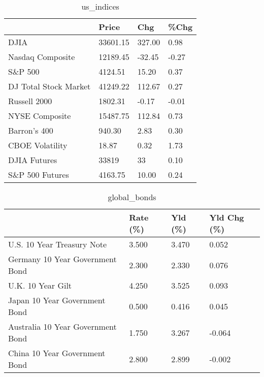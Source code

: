 \documentclass{article}%
\begin{document}
%


\begin{table}[htbp]%
\caption{us\_indices}%
\centering%
\begin{adjustbox}{width=1\textwidth}%
\begin{tabular}{llll}
\toprule
                      &    Price &    Chg &  \%Chg \\
\midrule
                 DJIA & 33601.15 & 327.00 &  0.98 \\
     Nasdaq Composite & 12189.45 & -32.45 & -0.27 \\
              S\&P 500 &  4124.51 &  15.20 &  0.37 \\
DJ Total Stock Market & 41249.22 & 112.67 &  0.27 \\
         Russell 2000 &  1802.31 &  -0.17 & -0.01 \\
       NYSE Composite & 15487.75 & 112.84 &  0.73 \\
         Barron's 400 &   940.30 &   2.83 &  0.30 \\
      CBOE Volatility &    18.87 &   0.32 &  1.73 \\
         DJIA Futures &    33819 &     33 &  0.10 \\
      S\&P 500 Futures &  4163.75 &  10.00 &  0.24 \\
\bottomrule
\end{tabular}
%
\end{adjustbox}%
\end{table}

%


\begin{table}[htbp]%
\caption{global\_bonds}%
\centering%
\begin{adjustbox}{width=1\textwidth}%
\begin{tabular}{llll}
\toprule
                                  & Rate (\%) & Yld (\%) & Yld Chg (\%) \\
\midrule
       U.S. 10 Year Treasury Note &    3.500 &   3.470 &       0.052 \\
  Germany 10 Year Government Bond &    2.300 &   2.330 &       0.076 \\
                U.K. 10 Year Gilt &    4.250 &   3.525 &       0.093 \\
    Japan 10 Year Government Bond &    0.500 &   0.416 &       0.045 \\
Australia 10 Year Government Bond &    1.750 &   3.267 &      -0.064 \\
    China 10 Year Government Bond &    2.800 &   2.899 &      -0.002 \\
\bottomrule
\end{tabular}
%
\end{adjustbox}%
\end{table}
\end{document}
